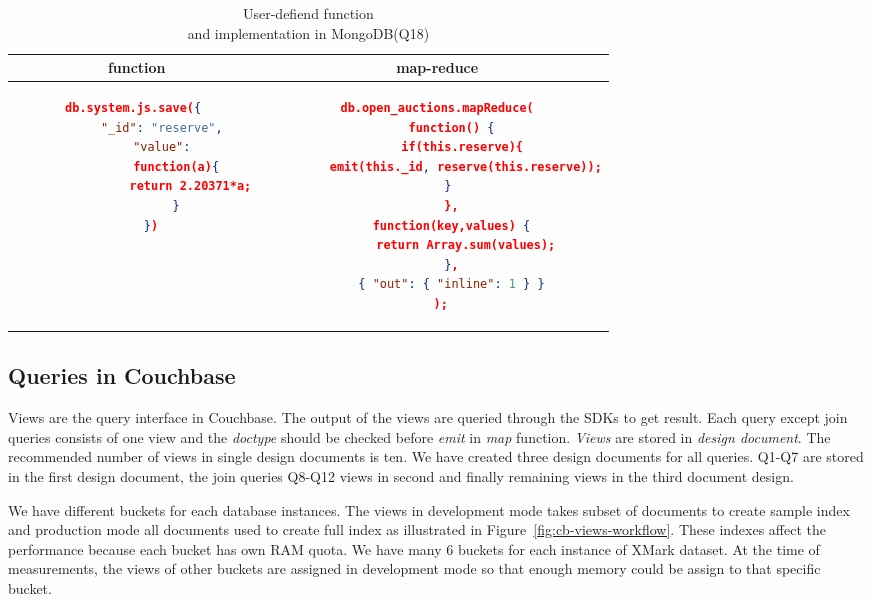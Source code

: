 \begin{longtable}[hbt]{c|c}
    \caption{ User-defiend function \\and implementation in MongoDB(Q18)}
    \label{tbl:mongodb-q18}\\
    {function } & {map-reduce}\\
	\hline
\begin{minipage}{.3\textwidth}
\begin{lstlisting}[language=JSON,basicstyle =\scriptsize]
    db.system.js.save({ 
        "_id": "reserve", 
        "value": 
            function(a){ 
                return 2.20371*a; 
            } 
    })
\end{lstlisting}
\end{minipage} &
\begin{minipage}{.4\textwidth}
\begin{lstlisting}[language=JSON,basicstyle =\scriptsize]
db.open_auctions.mapReduce(
    function() {
       if(this.reserve){
        emit(this._id, reserve(this.reserve));
       }    
    },
    function(key,values) {
        return Array.sum(values);
    },
    { "out": { "inline": 1 } }
 );
\end{lstlisting}
\end{minipage}
\end{longtable}

\newpage

\subsection{Queries in Couchbase}
Views are the query interface in Couchbase. The output of the views are queried through the SDKs to get result. Each query except join queries consists of one view and the \textit{doctype} should be checked before \textit{emit} in \textit{map} function. \textit{Views} are stored in \textit{design document}. The recommended number of views in single design documents is ten. We have created three design documents for all queries. Q1-Q7 are stored in the first design document, the join queries Q8-Q12 views in second and finally remaining views in the third document design. 
\par
We have different buckets for each database instances. 
The views in development mode takes subset of documents to create sample index and  production mode all documents used to create full index  as illustrated in Figure~\ref{fig:cb-views-workflow}. These indexes affect the performance because each bucket has own RAM quota. We have many 6 buckets for each instance of XMark dataset. At the time of measurements, the views of other buckets are  assigned in development mode so that enough memory could be assign to that specific bucket. 
\par

